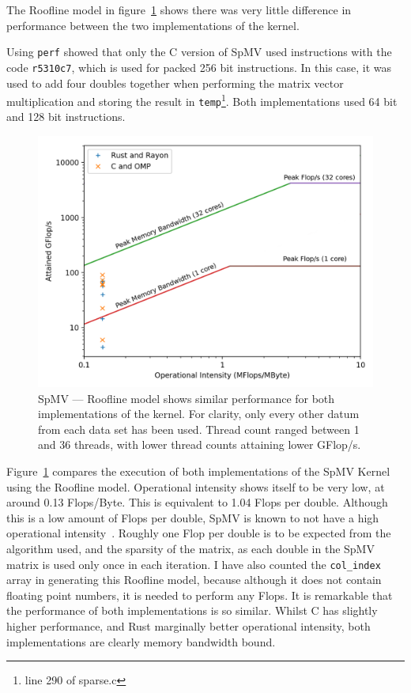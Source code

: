 The Roofline model in figure~\ref{fig:roofline} shows there was very little difference in performance between the two implementations of the kernel.

Using \texttt{perf} showed that only the C version of SpMV used instructions with the code \texttt{r5310c7}, which is used for packed 256 bit instructions. In this case, it was used to add four doubles together when performing the matrix vector multiplication and storing the result in \texttt{temp}\footnote{line 290 of sparse.c}. Both implementations used 64 bit and 128 bit instructions. 

\begin{figure}[h]
\centering
\includegraphics[width=.75\linewidth]{figs/sparse/roofline.png}
\caption[SpMV --- Roofline model]{SpMV --- Roofline model shows similar performance for both implementations of the kernel. For clarity, only every other datum from each data set has been used. Thread count ranged between 1 and 36 threads, with lower thread counts attaining lower GFlop/s.}\label{fig:roofline}
\end{figure}

Figure~\ref{fig:roofline} compares the execution of both implementations of the SpMV Kernel using the Roofline model. Operational intensity shows itself to be very low, at around 0.13 Flops/Byte. This is equivalent to 1.04 Flops per double.
Although this is a low amount of Flops per double, SpMV is known to not have a high operational intensity~\cite{SparseArith}. Roughly one Flop per double is to be expected from the algorithm used, and the sparsity of the matrix, as each double in the SpMV matrix is used only once in each iteration. I have also counted the \texttt{col\_index} array in generating this Roofline model, because although it does not contain floating point numbers, it is needed to perform any Flops.
It is remarkable that the performance of both implementations is so similar. Whilst C has slightly higher performance, and Rust marginally better operational intensity, both implementations are clearly memory bandwidth bound. 

